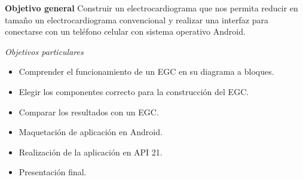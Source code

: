 
\textbf{Objetivo general}
Construir un electrocardiograma que nos permita reducir en tamaño un electrocardiograma convencional y realizar una interfaz para conectarse con un teléfono celular con sistema operativo Android.\newline\par
\textit{Objetivos particulares}
\begin{itemize}
\item Comprender el funcionamiento de un EGC en su diagrama a bloques.
\item Elegir los componentes correcto para la construcción del EGC.
\item Comparar los resultados con un EGC.
\item Maquetación de aplicación en Android.
\item Realización de la aplicación en API 21.
\item Presentación final.
\end{itemize}
